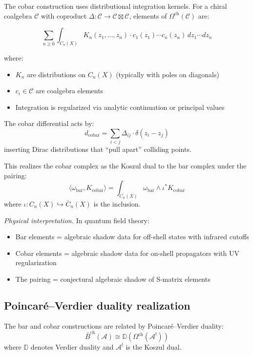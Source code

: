 \begin{example}\label{ex:cobar-kernels}
The cobar construction uses distributional integration kernels. For a chiral coalgebra $\mathcal{C}$ 
with coproduct $\Delta: \mathcal{C} \to \mathcal{C} \boxtimes \mathcal{C}$, elements of $\Omega^{\text{ch}}(\mathcal{C})$ are:

\[\sum_{n \geq 0} \int_{C_n(X)} K_n(z_1, \ldots, z_n) \cdot c_1(z_1) \cdots c_n(z_n) \, dz_1 \cdots dz_n\]

where:
\begin{itemize}
\item $K_n$ are distributions on $C_n(X)$ (typically with poles on diagonals)
\item $c_i \in \mathcal{C}$ are coalgebra elements  
\item Integration is regularized via analytic continuation or principal values
\end{itemize}

The cobar differential acts by:
\[d_{\text{cobar}} = \sum_{i<j} \Delta_{ij} \cdot \delta(z_i - z_j)\]
inserting Dirac distributions that ``pull apart'' colliding points.

This realizes the cobar complex as the Koszul dual to the bar complex under the pairing:
\[\langle \omega_{\text{bar}}, K_{\text{cobar}} \rangle = \int_{\overline{C}_n(X)} \omega_{\text{bar}} \wedge \iota^* K_{\text{cobar}}\]
where $\iota: C_n(X) \hookrightarrow \overline{C}_n(X)$ is the inclusion.

\emph{Physical interpretation.} In quantum field theory:
\begin{itemize}
\item Bar elements = algebraic shadow data for off-shell states with infrared cutoffs
\item Cobar elements = algebraic shadow data for on-shell propagators with UV regularization
\item The pairing = conjectural algebraic shadow of S-matrix elements
\end{itemize}
\end{example}

\subsection{Poincaré--Verdier duality realization}

\begin{theorem}\label{thm:poincare-verdier}
The bar and cobar constructions are related by Poincaré--Verdier duality:
\[
\bar{B}^{\text{ch}}(\mathcal{A}) \cong \mathbb{D}(\Omega^{\text{ch}}(\mathcal{A}^!))
\]
where $\mathbb{D}$ denotes Verdier duality and $\mathcal{A}^!$ is the Koszul dual.
\end{theorem}

